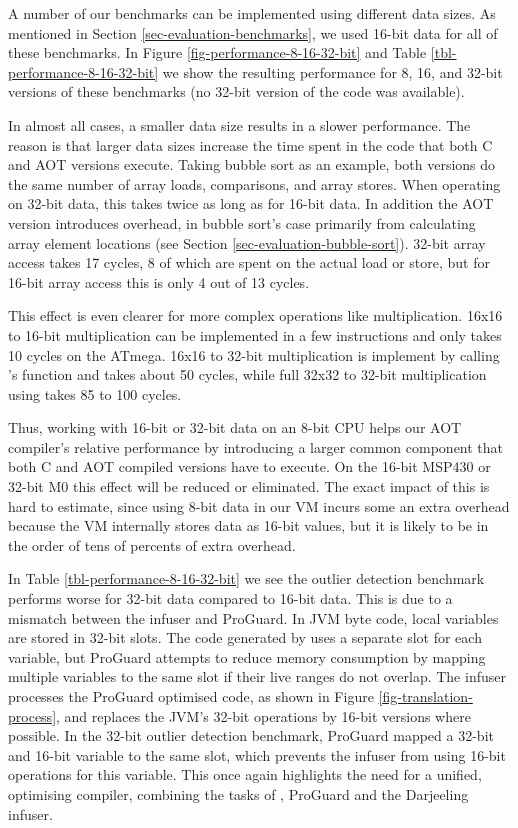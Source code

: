 A number of our benchmarks can be implemented using different data sizes. As mentioned in Section \ref{sec-evaluation-benchmarks}, we used 16-bit data for all of these benchmarks. In Figure \ref{fig-performance-8-16-32-bit} and Table \ref{tbl-performance-8-16-32-bit} we show the resulting performance for 8, 16, and 32-bit versions of these benchmarks (no 32-bit version of the  code was available).

In almost all cases, a smaller data size results in a slower performance. The reason is that larger data sizes increase the time spent in the code that both C and AOT versions execute. Taking bubble sort as an example, both versions do the same number of array loads, comparisons, and array stores. When operating on 32-bit data, this takes twice as long as for 16-bit data. In addition the AOT version introduces overhead, in bubble sort's case primarily from calculating array element locations (see Section \ref{sec-evaluation-bubble-sort}). 32-bit array access takes 17 cycles, 8 of which are spent on the actual load or store, but for 16-bit array access this is only 4 out of 13 cycles.

This effect is even clearer for more complex operations like multiplication. 16x16 to 16-bit multiplication can be implemented in a few instructions and only takes 10 cycles on the ATmega. 16x16 to 32-bit multiplication is implement by calling 's  function and takes about 50 cycles, while full 32x32 to 32-bit multiplication using  takes 85 to 100 cycles.

Thus, working with 16-bit or 32-bit data on an 8-bit CPU helps our AOT compiler's relative performance by introducing a larger common component that both C and AOT compiled versions have to execute. On the 16-bit MSP430 or 32-bit M0 this effect will be reduced or eliminated. The exact impact of this is hard to estimate, since using 8-bit data in our VM incurs some an extra overhead because the VM internally stores data as 16-bit values, but it is likely to be in the order of tens of percents of extra overhead.

In Table \ref{tbl-performance-8-16-32-bit} we see the outlier detection benchmark performs worse for 32-bit data compared to 16-bit data. This is due to a mismatch between the infuser and ProGuard. In JVM byte code, local variables are stored in 32-bit slots. The code generated by  uses a separate slot for each variable, but ProGuard attempts to reduce memory consumption by mapping multiple variables to the same slot if their live ranges do not overlap. The infuser processes the ProGuard optimised code, as shown in Figure \ref{fig-translation-process}, and replaces the JVM's 32-bit operations by 16-bit versions where possible. In the 32-bit outlier detection benchmark, ProGuard mapped a 32-bit and 16-bit variable to the same slot, which prevents the infuser from using 16-bit operations for this variable. This once again highlights the need for a unified, optimising compiler, combining the tasks of , ProGuard and the Darjeeling infuser.

